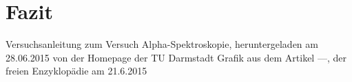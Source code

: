 \documentclass[bigchapter,colorback,accentcolor=tud4b,linedtoc,11pt]{tudreport}
\begin{document}
\chapter{Fazit}
\cleardoublepage{}
\newpage
\begin{thebibliography}{100}
   Versuchsanleitung zum Versuch Alpha-Spektroskopie, heruntergeladen am 28.06.2015 von der Homepage der TU Darmstadt
   Grafik aus dem Artikel ---, der freien Enzyklopädie am 21.6.2015 \url{}
  
\end{thebibliography}
\end{document}
